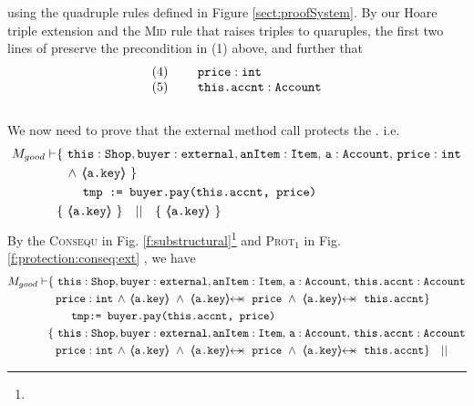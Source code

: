 \begin{proofO}
\noindent
{} using the quadruple rules defined in Figure \ref{sect:proofSystem}. 
By our Hoare triple extension and the \textsc{Mid} rule that raises triples to quaruples, the first two lines
of  preserve the precondition in (1) above, and further that 
\small
$$
\begin{array}{ll}
 \text{(4)} \ \ \ \ &  \mbox{\normalfont{\texttt{price}}} : \mbox{\normalfont{\texttt{int}}}
\\
\text{(5)} \ \ \ \ & \mbox{\normalfont{\texttt{this.accnt}}} : \mbox{\normalfont{\texttt{Account}}}
\end{array}
$$
\\ 
We now need to prove that the external method call  protects the . i.e.
\small
\begin{align*}
M_{good} \vdash & \{ \  \prg{this}:\prg{Shop}, \prg{buyer} : \prg{external}, \prg{anItem} : \prg{Item},\, \prg{a}:\prg{Account},\, \prg{price} : \prg{int}  \\
				& \ \  \wedge\,   {\inside{\prg{a.key}}}\  \} \\
		  		& \SPT  \prg{tmp := buyer.pay(this.accnt, price)}\ \\  
		  		& \{ \ {\inside{\prg{a.key}}} \ \} \ \ \  || \ \ \ 
		  		   \{ \ {\inside{\prg{a.key}}}\  \}
\end{align*}
\normalsize
By the \textsc{Consequ} in Fig. \ref{f:substructural}\footnote{}
 and \textsc{Prot$_1$} in Fig. \ref{f:protection:conseq:ext} , we have
\small
\begin{align*}
M_{good} \vdash & \{ \ \prg{this}:\prg{Shop}, \prg{buyer} : \prg{external}, \prg{anItem} : \prg{Item},\, \prg{a}:\prg{Account},\, \prg{this.accnt}:\prg{Account}\\
				& \ \ \prg{price} : \prg{int} \,
				  \wedge\, 
				  {\inside{\prg{a.key}}}\ \wedge\ 
				  \protectedFrom{\prg{a.key}}{\prg{price}}\ \wedge\ 
				   \protectedFrom{\prg{a.key}}{\prg{this.accnt}}\} \\
		  		& \SPT \prg{tmp:= buyer.pay(this.accnt, price)}\ \\  
		  		& \{ \  \prg{this}:\prg{Shop}, \prg{buyer} : \prg{external}, \prg{anItem} : \prg{Item},\, \prg{a}:\prg{Account},\, \prg{this.accnt}:\prg{Account}\\
				& \ \ \prg{price} : \prg{int}\,
				  \wedge\, 
				  {\inside{\prg{a.key}}}\ \wedge\ 
				  \protectedFrom{\prg{a.key}}{\prg{price}}\ \wedge\ 
				   \protectedFrom{\prg{a.key}}{\prg{this.accnt}}\} \ \ \  || \ \ \ \\

\end{align*}
\end{proofO}
